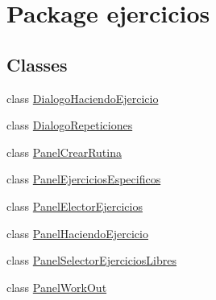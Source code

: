 \hypertarget{namespaceejercicios}{}\section{Package ejercicios}
\label{namespaceejercicios}
\subsection*{Classes}
\begin{DoxyCompactItemize}
\item 
class \mbox{\hyperlink{classejercicios_1_1_dialogo_haciendo_ejercicio}{Dialogo\+Haciendo\+Ejercicio}}
\item 
class \mbox{\hyperlink{classejercicios_1_1_dialogo_repeticiones}{Dialogo\+Repeticiones}}
\item 
class \mbox{\hyperlink{classejercicios_1_1_panel_crear_rutina}{Panel\+Crear\+Rutina}}
\item 
class \mbox{\hyperlink{classejercicios_1_1_panel_ejercicios_especificos}{Panel\+Ejercicios\+Especificos}}
\item 
class \mbox{\hyperlink{classejercicios_1_1_panel_elector_ejercicios}{Panel\+Elector\+Ejercicios}}
\item 
class \mbox{\hyperlink{classejercicios_1_1_panel_haciendo_ejercicio}{Panel\+Haciendo\+Ejercicio}}
\item 
class \mbox{\hyperlink{classejercicios_1_1_panel_selector_ejercicios_libres}{Panel\+Selector\+Ejercicios\+Libres}}
\item 
class \mbox{\hyperlink{classejercicios_1_1_panel_work_out}{Panel\+Work\+Out}}
\end{DoxyCompactItemize}
